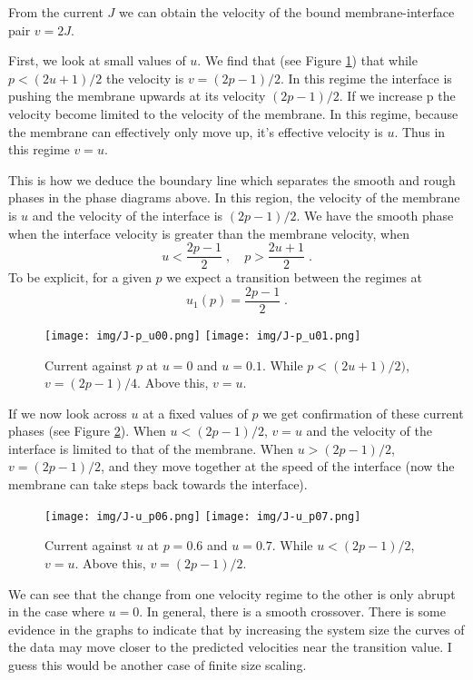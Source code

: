 \documentclass[a4paper,10pt]{article}
\newcommand{\fref}[1]{Figure \ref{#1}}
\begin{document}
From the current $J$ we can obtain the velocity of the bound membrane-interface pair $v=2J$.

First, we look at small values of $u$. We find that (see \fref{fig:J-p_small_u}) that while $p < (2u+1)/2$ the velocity is $v = (2p-1)/2$. In this regime the interface is pushing the membrane upwards at its velocity $(2p-1)/2$. If we increase p the velocity become limited to the velocity of the membrane. In this regime, because the membrane can effectively only move up, it's effective velocity is $u$. Thus in this regime $v=u$.

This is how we deduce the boundary line which separates the smooth and rough phases in the phase diagrams above. In this region, the velocity of the membrane is $u$ and the velocity of the interface is $(2p-1)/2$. We have the smooth phase when the interface velocity is greater than the membrane velocity, when
\begin{equation}
 u < \frac{2p-1}{2} \;, \quad p > \frac{2u+1}{2} \;.
\end{equation}
To be explicit, for a given $p$ we expect a transition between the regimes at
\begin{equation}\label{eq:u1}
 u_1(p) = \frac{2p-1}{2} \;.
\end{equation}

\begin{figure}
 \centering
 \texttt{[image: img/J-p\_u00.png]}
 \texttt{[image: img/J-p\_u01.png]}
 \caption{Current against $p$ at $u=0$ and $u=0.1$. While $p < (2u+1)/2)$, $v = (2p-1)/4$. Above this, $v=u$. }
 \label{fig:J-p_small_u}
\end{figure}

If we now look across $u$ at a fixed values of $p$ we get confirmation of these current phases (see \fref{fig:J-u_at_p}). When $u < (2p-1)/2$, $v = u$ and the velocity of the interface is limited to that of the membrane. When $u > (2p-1)/2$, $v = (2p-1)/2$, and they move together at the speed of the interface (now the membrane can take steps back towards the interface).

\begin{figure}
 \centering
 \texttt{[image: img/J-u\_p06.png]}
 \texttt{[image: img/J-u\_p07.png]}
 \caption{Current against $u$ at $p=0.6$ and $u=0.7$. While $u < (2p-1)/2$, $v = u$. Above this, $v=(2p-1)/2$. }
 \label{fig:J-u_at_p}
\end{figure}

We can see that the change from one velocity regime to the other is only abrupt in the case where $u=0$. In general, there is a smooth crossover. There is some evidence in the graphs to indicate that by increasing the system size the curves of the data may move closer to the predicted velocities near the transition value. I guess this would be another case of finite size scaling.
\end{document}
